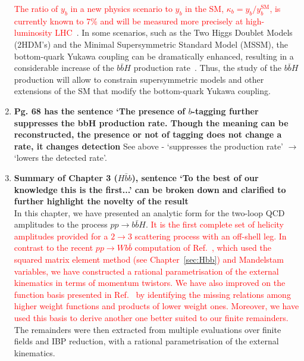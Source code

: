 \documentclass[main.tex]{subfiles}
\begin{document}
\begin{enumerate}
\textcolor{red}{The ratio of $y_b$ in a new physics scenario to $y_b$ in the SM, $\kappa_b = y_b / y_b^{\text{SM}}$, is currently known to 7\% and will be measured more precisely at high-luminosity LHC~\cite{Cepeda:2019klc}}. In some scenarios, such as the Two Higgs Doublet Models (2HDM's) and the Minimal
Supersymmetric Standard Model (MSSM), the bottom-quark Yukawa coupling can be dramatically enhanced,
resulting in a considerable increase of the $b\bar{b}H$ production
rate~\cite{Balazs:1998nt,Dawson:2005vi}.  Thus, the study of the $b\bar{b}H$ production will allow
to constrain supersymmetric models and other extensions of the SM that modify the bottom-quark
Yukawa coupling. %
\item \textbf{Pg. 68 has the sentence `The presence of $b$-tagging further suppresses the bbH
production rate. Though the meaning can be reconstructed, the presence or not of
tagging does not change a rate, it changes detection}
See above - `suppresses the production rate' $\rightarrow$ `lowers the detected rate'.

\item \textbf{Summary of Chapter 3 ($H\bar{b}b$), sentence `To the best of our knowledge this is the first...'
can be broken down and clarified to further highlight the novelty of the result}
\\
In this chapter, we have presented an analytic form for the two-loop QCD amplitudes to the process
$pp\to b\bar{b}H$. \textcolor{red}{It is the first complete set of helicity
amplitudes provided for a $2\to 3$ scattering process with an off-shell leg. In contrast to the recent $pp\to Wb\bar{b}$ computation of Ref.~\cite{Badger:2021nhg}, which used the squared matrix element method (see Chapter~\ref{sec:Hbb}) and Mandelstam variables, we have constructed a rational parametrisation of the external kinematics in terms of momentum twistors. We have also improved on the function basis presented in Ref.~\cite{Badger:2021nhg} by identifying the missing relations among higher weight functions and products of lower weight ones. Moreover, we have used this basis to derive another one better suited to our finite remainders.} The remainders were then extracted from multiple evaluations over finite fields and IBP reduction, with a rational parametrisation of the external kinematics.


\end{enumerate}
\end{document}
